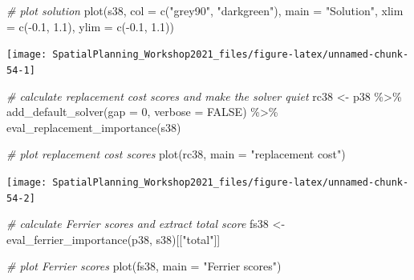\documentclass[
  12pt,
]{book}
\newenvironment{Shaded}{\begin{snugshade}}{\end{snugshade}}
\newcommand{\AttributeTok}[1]{\textcolor[rgb]{0.77,0.63,0.00}{#1}}
\newcommand{\CommentTok}[1]{\textcolor[rgb]{0.56,0.35,0.01}{\textit{#1}}}
\newcommand{\ConstantTok}[1]{\textcolor[rgb]{0.00,0.00,0.00}{#1}}
\newcommand{\DecValTok}[1]{\textcolor[rgb]{0.00,0.00,0.81}{#1}}
\newcommand{\FloatTok}[1]{\textcolor[rgb]{0.00,0.00,0.81}{#1}}
\newcommand{\FunctionTok}[1]{\textcolor[rgb]{0.00,0.00,0.00}{#1}}
\newcommand{\NormalTok}[1]{#1}
\newcommand{\OtherTok}[1]{\textcolor[rgb]{0.56,0.35,0.01}{#1}}
\newcommand{\SpecialCharTok}[1]{\textcolor[rgb]{0.00,0.00,0.00}{#1}}
\newcommand{\StringTok}[1]{\textcolor[rgb]{0.31,0.60,0.02}{#1}}
\begin{document}
\begin{Shaded}
\begin{Highlighting}[]
\CommentTok{\# plot solution}
\FunctionTok{plot}\NormalTok{(s38, }\AttributeTok{col =} \FunctionTok{c}\NormalTok{(}\StringTok{"grey90"}\NormalTok{, }\StringTok{"darkgreen"}\NormalTok{), }\AttributeTok{main =} \StringTok{"Solution"}\NormalTok{,}
     \AttributeTok{xlim =} \FunctionTok{c}\NormalTok{(}\SpecialCharTok{{-}}\FloatTok{0.1}\NormalTok{, }\FloatTok{1.1}\NormalTok{), }\AttributeTok{ylim =} \FunctionTok{c}\NormalTok{(}\SpecialCharTok{{-}}\FloatTok{0.1}\NormalTok{, }\FloatTok{1.1}\NormalTok{))}
\end{Highlighting}
\end{Shaded}

\begin{center}\texttt{[image: SpatialPlanning\_Workshop2021\_files/figure-latex/unnamed-chunk-54-1]} \end{center}

\begin{Shaded}
\begin{Highlighting}[]
\CommentTok{\# calculate replacement cost scores and make the solver quiet}
\NormalTok{rc38 }\OtherTok{\textless{}{-}}\NormalTok{ p38 }\SpecialCharTok{\%\textgreater{}\%}
  \FunctionTok{add\_default\_solver}\NormalTok{(}\AttributeTok{gap =} \DecValTok{0}\NormalTok{, }\AttributeTok{verbose =} \ConstantTok{FALSE}\NormalTok{) }\SpecialCharTok{\%\textgreater{}\%}
  \FunctionTok{eval\_replacement\_importance}\NormalTok{(s38)}

\CommentTok{\# plot replacement cost scores}
\FunctionTok{plot}\NormalTok{(rc38, }\AttributeTok{main =} \StringTok{"replacement cost"}\NormalTok{)}
\end{Highlighting}
\end{Shaded}

\begin{center}\texttt{[image: SpatialPlanning\_Workshop2021\_files/figure-latex/unnamed-chunk-54-2]} \end{center}

\begin{Shaded}
\begin{Highlighting}[]
\CommentTok{\# calculate Ferrier scores and extract total score}
\NormalTok{fs38 }\OtherTok{\textless{}{-}} \FunctionTok{eval\_ferrier\_importance}\NormalTok{(p38, s38)[[}\StringTok{"total"}\NormalTok{]]}

\CommentTok{\# plot Ferrier scores}
\FunctionTok{plot}\NormalTok{(fs38, }\AttributeTok{main =} \StringTok{"Ferrier scores"}\NormalTok{)}
\end{Highlighting}
\end{Shaded}
\end{document}
